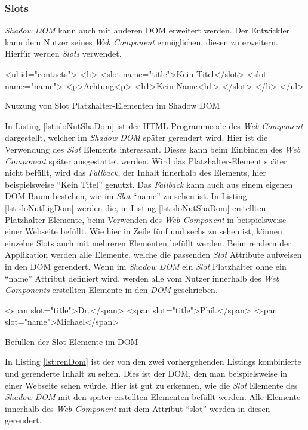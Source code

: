 \documentclass[12pt, paper=a4, bibtotoc, toc=listof, headsepline=true]{scrreprt}
\renewcommand{\smfootcite}[2][2]{\relax}
\begin{document}
			\subsubsection{Slots}
			\emph{Shadow \ac{DOM}} kann auch mit anderen \ac{DOM} erweitert werden. Der Entwickler kann dem Nutzer seines \emph{Web Component} ermöglichen, diesen zu erweitern. Hierfür werden \emph{Slots} verwendet. 
			\begin{listing}
			\begin{HTMLcode*}{}
<ul id="contacts">
   <li>
      <slot name="title">Kein Titel</slot>
      <slot name="name">
         <p>Achtung<p>
         <h1>Kein Name<h1>
      </slot>
   </li>
</ul>
			\end{HTMLcode*}
			\caption{Nutzung von Slot Platzhalter-Elementen im Shadow DOM}
			\label{lst:sloNutShaDom}
			\end{listing}
			In Listing \ref{lst:sloNutShaDom} ist der \ac{HTML} Programmcode des \emph{Web Component} dargestellt, welcher im \emph{Shadow \ac{DOM}} später gerendert wird. Hier ist die Verwendung des \emph{Slot} Elements interessant. Dieses kann beim Einbinden des \emph{Web Component} später ausgestattet werden. Wird das Platzhalter-Element später nicht befüllt, wird das \emph{Fallback}, der Inhalt innerhalb des Elements, hier beispielsweise \enquote{Kein Titel} genutzt. Das \emph{Fallback} kann auch aus einem eigenen \ac{DOM} Baum bestehen, wie im \emph{Slot} \enquote{name} zu sehen ist.\smfootcite{Bidelman2016} In Listing \ref{lst:sloNutLigDom} werden die, in Listing \ref{lst:sloNutShaDom} erstellten Platzhalter-Elemente, beim Verwenden des \emph{Web Component} in beispielsweise einer Webseite befüllt. Wie hier in Zeile fünf und sechs zu sehen ist, können einzelne Slots auch mit mehreren Elementen befüllt werden. Beim rendern der Applikation werden alle Elemente, welche die passenden \emph{Slot} Attribute aufweisen in den \ac{DOM} gerendert. Wenn im \emph{Shadow \ac{DOM}} ein \emph{Slot} Platzhalter ohne ein \enquote{name} Attribut definiert wird, werden alle vom Nutzer innerhalb des \emph{Web Components} erstellten Elemente in den \emph{DOM} geschrieben.
			\begin{listing}
				\begin{HTMLcode*}{}
<span slot="title">Dr.</span>
<span slot="title">Phil.</span>
<span slot="name">Michael</span>
				\end{HTMLcode*}
				\caption{Befüllen der Slot Elemente im DOM}
				\label{lst:sloNutLigDom}
			\end{listing}
			In Listing \ref{lst:renDom} ist der von den zwei vorhergehenden Listings kombinierte und gerenderte Inhalt zu sehen. Dies ist der \ac{DOM}, den man beispielsweise in einer Webseite sehen würde. Hier ist gut zu erkennen, wie die \emph{Slot} Elemente des \emph{Shadow \ac{DOM}} mit den später erstellten Elementen befüllt werden. Alle Elemente innerhalb des \emph{Web Component} mit dem Attribut \enquote{slot} werden in diesen gerendert.
\end{document}
